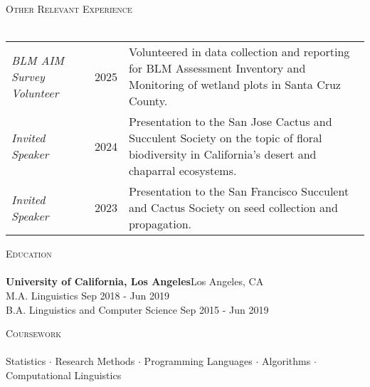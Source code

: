 \documentclass[]{article}
\newcommand{\lineunder} {
	\vspace*{-8pt} \\
	\hspace*{-18pt} \hrulefill \\
}
\newcommand{\header} [1] {
	{\hspace*{-18pt}\vspace*{6pt} \textsc{#1}}
	\vspace*{-6pt} \lineunder
}
\begin{document}
	\header{Other Relevant Experience}
	\begingroup
	\renewcommand*{\arraystretch}{1.5}
	\begin{tabular}{ p{45mm} p{1cm} p{10cm} }
	\textit{BLM AIM Survey Volunteer} & 2025 & Volunteered in data collection and reporting for BLM Assessment Inventory and Monitoring of wetland plots in Santa Cruz County. \\
	\textit{Invited Speaker} & 2024 & Presentation to the San Jose Cactus and Succulent Society on the topic of floral biodiversity in California's desert and chaparral ecosystems. \\
	\textit{Invited Speaker} & 2023 & Presentation to the San Francisco Succulent and Cactus Society on seed collection and propagation. \\
	\end{tabular}
	\endgroup

	\header{Education}
	\textbf{University of California, Los Angeles}\hfill Los Angeles, CA\\
	M.A. Linguistics \hfill Sep 2018 - Jun 2019\\
	\vspace{1mm}
	B.A. Linguistics and Computer Science \hfill Sep 2015 - Jun 2019\\
	\vspace{1mm}
	\vspace{1mm}
	
	\header{Coursework}
	Statistics $\cdot$ Research Methods $\cdot$ Programming Languages $\cdot$ Algorithms $\cdot$ Computational Linguistics
	\vspace*{10mm}
	
\end{document}
